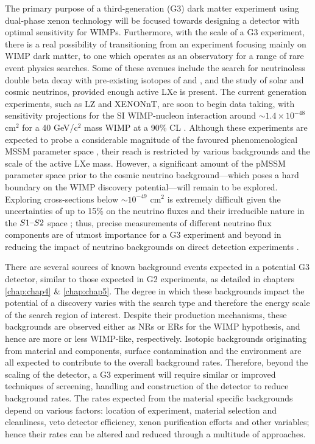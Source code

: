 The primary purpose of a third-generation (G3) dark matter experiment using dual-phase xenon technology will be focused towards designing a detector with optimal sensitivity for WIMPs. Furthermore, with the scale of a G3 experiment, there is a real possibility of transitioning from an experiment focusing mainly on WIMP dark matter, to one which operates as an observatory for a range of rare event physics searches. Some of these avenues include the search for neutrinoless double beta decay with pre-existing isotopes of \XeOTF{} and \XeOTS{}, and the study of solar and cosmic neutrinos, provided enough active LXe is present. The current generation experiments, such as LZ and XENONnT, are soon to begin data taking, with sensitivity projections for the SI WIMP-nucleon interaction around $\sim1.4 \times 10^{-48}$ cm$^{2}$ for a 40 GeV/c$^{2}$ mass WIMP at a 90\% CL \cite{akerib2018projected, Aprile:2020vtw}. Although these experiments are expected to probe a considerable magnitude of the favoured phenomenological MSSM parameter space \cite{pMSSM11}, their reach is restricted by various backgrounds and the scale of the active LXe mass. However, a significant amount of the pMSSM parameter space prior to the cosmic neutrino background---which poses a hard boundary on the WIMP discovery potential---will remain to be explored. Exploring cross-sections below $\sim10^{-49}$ cm$^{2}$ is extremely difficult given the uncertainties of up to 15\% on the neutrino fluxes and their irreducible nature in the $S1\text{--}{}S2$ space \cite{Barr:2006it}; thus, precise measurements of different neutrino flux components are of utmost importance for a G3 experiment and beyond in reducing the impact of neutrino backgrounds on direct detection experiments \cite{neutrino_floor}.

There are several sources of known background events expected in a potential G3 detector, similar to those expected in G2 experiments, as detailed in chapters \ref{chap:chap4} \& \ref{chap:chap5}. The degree in which these backgrounds impact the potential of a discovery varies with the search type and therefore the energy scale of the search region of interest. Despite their production mechanisms, these backgrounds are observed either as NRs or ERs for the WIMP hypothesis, and hence are more or less WIMP-like, respectively. Isotopic backgrounds originating from material and components, surface contamination and the environment are all expected to contribute to the overall background rates. Therefore, beyond the scaling of the detector, a G3 experiment will require similar or improved techniques of screening, handling and construction of the detector to reduce background rates. The rates expected from the material specific backgrounds depend on various factors: location of experiment, material selection and cleanliness, veto detector efficiency, xenon purification efforts and other variables; hence their rates can be altered and reduced through a multitude of approaches.

